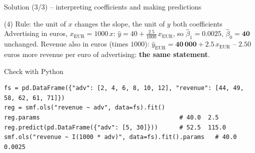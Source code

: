 \documentclass[aspectratio=169,11pt]{beamer}
\begin{document}
\begin{frame}[fragile]{Solution (3/3) -- interpreting coefficients and making predictions}
  \lstset{aboveskip=2pt,belowskip=2pt}
  \small
  \vspace{-6pt}
  \begin{block}{(4) Rule: the unit of $x$ changes the slope, the unit of $y$ both coefficients}
    Advertising in euros, $x_{\text{EUR}} = 1000\,x$:
    $\hat{y} = 40 + \frac{2.5}{1000}\,x_{\text{EUR}}$, so
    $\hat{\beta}_1 = \mathbf{0.0025}$, $\hat{\beta}_0 = \mathbf{40}$ unchanged.
    Revenue also in euros (times $1000$):
    $\hat{y}_{\text{EUR}} = \mathbf{40\,000} + \mathbf{2.5}\,x_{\text{EUR}}$ --
    $2.50$ euros more revenue per euro of advertising: \textbf{the same
    statement}.
  \end{block}
  \vspace{-4pt}
  \begin{exampleblock}{Check with Python}
\begin{lstlisting}
fs = pd.DataFrame({"adv": [2, 4, 6, 8, 10, 12], "revenue": [44, 49, 58, 62, 61, 71]})
reg = smf.ols("revenue ~ adv", data=fs).fit()
reg.params                                       # 40.0  2.5
reg.predict(pd.DataFrame({"adv": [5, 30]}))      # 52.5  115.0
smf.ols("revenue ~ I(1000 * adv)", data=fs).fit().params   # 40.0  0.0025
\end{lstlisting}
  \end{exampleblock}

  \vspace{-8pt}
\end{frame}
\end{document}
